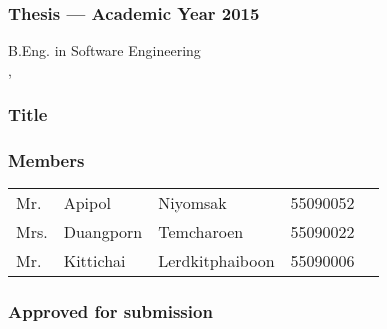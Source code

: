 \thispagestyle{empty}

\begin{flushleft}
\subsubsection{\Large{Thesis --- Academic Year 2015}}
B.Eng. in Software Engineering \\
\IC, \kmitl

\vspace{2cm}

\subsubsection{\Large{Title}}
\dms

\vspace{1cm}
\subsubsection{\Large{Members}}
\begin{tabular}{lllll}
	Mr. & Apipol & Niyomsak & 55090052 & \\
	Mrs. & Duangporn & Temcharoen & 55090022 & \\
	Mr. & Kittichai & Lerdkitphaiboon & 55090006 & \\
\end{tabular}
\end{flushleft}

\vfill

\begin{flushright}
\subsubsection{\Large{Approved for submission}}
\vspace{1cm}
\end{flushright}